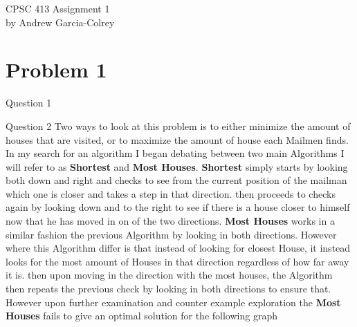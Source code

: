 \documentclass[11pt]{article}
\author{Andrew}
\date{text }
\begin{document}
\begin{center}
CPSC 413 Assignment 1 \\
by Andrew Garcia-Colrey
\end{center}
\section{Problem 1}
Question 1
\begin{center}
\end{center}
Question 2
\hfill \break
\break
Two ways to look at this problem is to either minimize the amount of houses that are visited, or to maximize the amount of house each Mailmen finds. In my search for an algorithm I began debating between two main Algorithms I will refer to as \textbf{Shortest}  and \textbf{Most Houses}. 
\hfill \break
\break
\textbf{Shortest} simply starts by looking both down and right and checks to see from the current position of the mailman which one is closer and takes a step in that direction. then proceeds to checks again by looking down and to the right to see if there is a house closer to himself now that he has moved in on of the two directions.
\hfill \break
\break
 \textbf{Most Houses} works in a similar fashion the previous Algorithm by looking in both directions. However where this Algorithm differ is that instead of looking for closest House, it instead looks for the most amount of Houses in that direction regardless of how far away it is. then upon moving in the direction with the most houses, the Algorithm then repeats the previous check by looking in both directions to ensure that.
 \hfill \break
\break
However upon further examination and counter example exploration the  \textbf{Most Houses} fails to give an optimal solution for the following graph


\begin{center}
\end{center}
 
\end{document}
